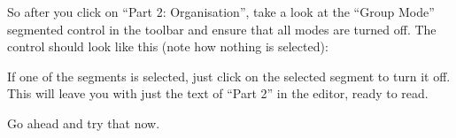\documentclass[10pt,oneside]{memoir}
\def\mybibliostyle{plain}
\def\bibliocommand{}
\begin{document}
So after you click on ``Part 2: Organisation'', take a look at the ``Group Mode'' segmented control in the toolbar and ensure that all modes are turned off. The control should look like this (note how nothing is selected):


\begin{figure}
\begin{center}
\end{center}
\label{tutorial-part2_organisation.png}
\end{figure}



If one of the segments is selected, just click on the selected segment to turn it off. This will leave you with just the text of ``Part 2'' in the editor, ready to read.


Go ahead and try that now.


%
%

\backmatter


\bibliocommand

\printglossary


\printindex
\end{document}
